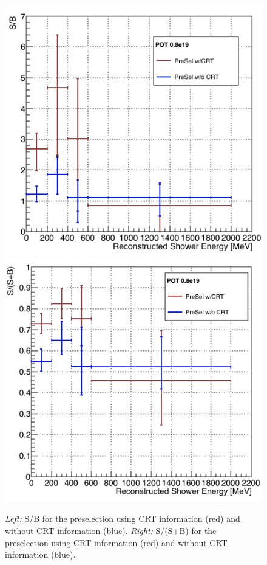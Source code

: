 \begin{figure}[h!]
\centering
\includegraphics[scale=0.4]{images/SoverB}
\includegraphics[scale=0.4]{images/SOverTot.png}
\caption{\textit{Left:} S/B for the preselection using CRT information (red) and without CRT information (blue). \textit{Right:} S/(S+B) for the preselection using CRT information (red) and without CRT information (blue).}
\label{fig:Significance}
\end{figure}


